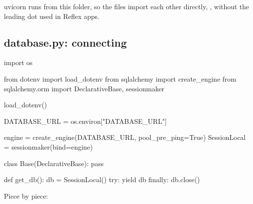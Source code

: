 uvicorn runs from this folder, so the files import each other directly, , without the leading dot used in Reflex apps.

\subsection{database.py: connecting}

\begin{py}
import os

from dotenv import load_dotenv
from sqlalchemy import create_engine
from sqlalchemy.orm import DeclarativeBase, sessionmaker

load_dotenv()

DATABASE_URL = os.environ["DATABASE_URL"]

engine = create_engine(DATABASE_URL, pool_pre_ping=True)
SessionLocal = sessionmaker(bind=engine)


class Base(DeclarativeBase):
	pass


def get_db():
	db = SessionLocal()
	try:
		yield db
	finally:
		db.close()
\end{py}

Piece by piece:

